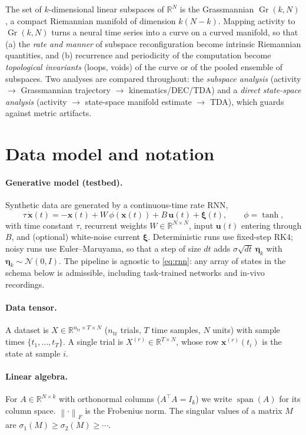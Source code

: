 \documentclass[11pt]{article}
\newcommand{\R}{\mathbb{R}}
\newcommand{\Gr}{\operatorname{Gr}}
\newcommand{\norm}[1]{\left\lVert #1 \right\rVert}
\newcommand{\Span}{\operatorname{span}}
\theoremstyle{definition}
\begin{document}
The set of $k$-dimensional linear subspaces of $\R^N$ is the Grassmannian
$\Gr(k,N)$, a compact Riemannian manifold of dimension $k(N-k)$. Mapping activity to
$\Gr(k,N)$ turns a neural time series into a curve on a curved manifold, so that (a)
the \emph{rate and manner} of subspace reconfiguration become intrinsic Riemannian
quantities, and (b) recurrence and periodicity of the computation become
\emph{topological invariants} (loops, voids) of the curve or of the pooled ensemble
of subspaces. Two analyses are compared throughout: the \emph{subspace analysis}
(activity $\to$ Grassmannian trajectory $\to$ kinematics/DEC/TDA) and a \emph{direct
state-space analysis} (activity $\to$ state-space manifold estimate $\to$ TDA), which
guards against metric artifacts.

\section{Data model and notation}
\label{sec:data}

\paragraph{Generative model (testbed).} Synthetic data are generated by a
continuous-time rate RNN,
\begin{equation}
\tau\,\dot{\bm{x}}(t) = -\bm{x}(t) + W\,\phi\!\left(\bm{x}(t)\right) + B\,\bm{u}(t) + \bm{\xi}(t),
\qquad \phi=\tanh,
\label{eq:rnn}
\end{equation}
with time constant $\tau$, recurrent weights $W\in\R^{N\times N}$, input $\bm{u}(t)$
entering through $B$, and (optional) white-noise current $\bm{\xi}$. Deterministic
runs use fixed-step RK4; noisy runs use Euler--Maruyama, so that a step of size $dt$
adds $\sigma\sqrt{dt}\,\bm{\eta}_k$ with $\bm{\eta}_k\sim\mathcal{N}(0,I)$. The
pipeline is agnostic to \eqref{eq:rnn}: any array of states in the schema below is
admissible, including task-trained networks and in-vivo recordings.

\paragraph{Data tensor.} A dataset is $X\in\R^{n_{\mathrm{tr}}\times T\times N}$
($n_{\mathrm{tr}}$ trials, $T$ time samples, $N$ units) with sample times
$\{t_1,\dots,t_T\}$. A single trial is $X^{(r)}\in\R^{T\times N}$, whose row
$\bm{x}^{(r)}(t_i)$ is the state at sample $i$.

\paragraph{Linear algebra.} For $A\in\R^{N\times k}$ with orthonormal columns
($A^\top A = I_k$) we write $\Span(A)$ for its column space. $\norm{\cdot}_F$ is the
Frobenius norm. The singular values of a matrix $M$ are $\sigma_1(M)\ge\sigma_2(M)\ge\cdots$.
\end{document}

